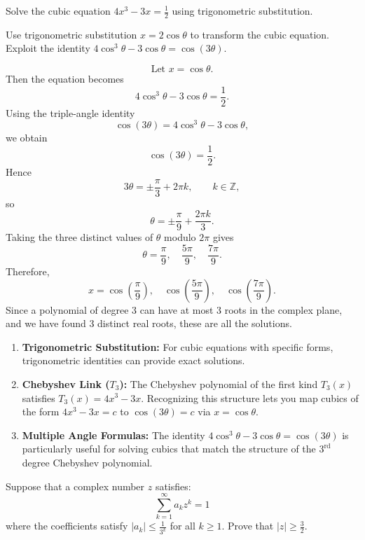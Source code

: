 \begin{problem}
Solve the cubic equation $4x^3 - 3x = \frac{1}{2}$ using trigonometric substitution.
\end{problem}

\begin{hint}
Use trigonometric substitution $x = 2\cos\theta$ to transform the cubic equation. Exploit the identity $4\cos^3\theta - 3\cos\theta = \cos(3\theta)$.
\end{hint}

\begin{solution}
\[
\text{Let }x=\cos\theta.
\]
Then the equation becomes
\[
4\cos^3\theta-3\cos\theta=\frac12.
\]
Using the triple-angle identity
\[
\cos(3\theta)=4\cos^3\theta-3\cos\theta,
\]
we obtain
\[
\cos(3\theta)=\frac12.
\]
Hence
\[
3\theta=\pm\frac{\pi}{3}+2\pi k,
\qquad k\in\mathbb{Z},
\]
so
\[
\theta=\pm\frac{\pi}{9}+\frac{2\pi k}{3}.
\]
Taking the three distinct values of $\theta$ modulo $2\pi$ gives
\[
\theta=\frac{\pi}{9},\quad \frac{5\pi}{9},\quad \frac{7\pi}{9}.
\]
Therefore,
\[
x=\cos\left(\frac{\pi}{9}\right),\quad
\cos\left(\frac{5\pi}{9}\right),\quad
\cos\left(\frac{7\pi}{9}\right).
\]
Since a polynomial of degree 3 can have at most 3 roots in the complex plane, and we have found 3 distinct real roots, these are all the solutions.
\end{solution}

\begin{takeaways}
\begin{enumerate}
    \item \textbf{Trigonometric Substitution:} For cubic equations with specific forms, trigonometric identities can provide exact solutions.
    \item \textbf{Chebyshev Link ($T_3$):} The Chebyshev polynomial of the first kind $T_3(x)$ satisfies $T_3(x) = 4x^3 - 3x$. Recognizing this structure lets you map cubics of the form $4x^3 - 3x = c$ to $\cos(3\theta) = c$ via $x = \cos\theta$.
    \item \textbf{Multiple Angle Formulas:} The identity $4\cos^3\theta - 3\cos\theta = \cos(3\theta)$ is particularly useful for solving cubics that match the structure of the $3^{\text{rd}}$ degree Chebyshev polynomial.
\end{enumerate}
\end{takeaways}


\begin{problem}
Suppose that a complex number $z$ satisfies:
\[ \sum_{k=1}^{\infty} a_k z^k = 1 \]
where the coefficients satisfy $|a_k| \le \frac{1}{3^k}$ for all $k \ge 1$.
Prove that $|z| \ge \frac{3}{2}$.
\end{problem}

